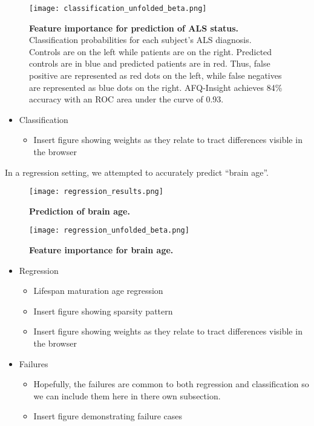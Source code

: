 \begin{figure}[!h]
    \centering
    \texttt{[image: classification\_unfolded\_beta.png]}
    \caption{{\bf Feature importance for prediction of ALS status.}
        Classification probabilities for each subject's ALS diagnosis. Controls are on the left while patients are on the right. Predicted controls are in blue and predicted patients are in red. Thus, false positive are represented as red dots on the left, while false negatives are represented as blue dots on the right. AFQ-Insight achieves 84\% accuracy with an ROC area under the curve of 0.93.
    }
    \label{fig:class-beta}
\end{figure}

\begin{itemize}
  \item Classification
    \begin{itemize}
      \item Insert figure showing weights as they relate to tract differences visible in the browser
    \end{itemize}
\end{itemize}

In a regression setting, we attempted to accurately predict ``brain age''.

\begin{figure}[!h]
    \centering
    \texttt{[image: regression\_results.png]}
    \caption{{\bf Prediction of brain age.}
    }
    \label{fig:regress-results}
\end{figure}

\begin{figure}[!h]
    \centering
    \texttt{[image: regression\_unfolded\_beta.png]}
    \caption{{\bf Feature importance for brain age.}
    }
    \label{fig:regress-beta}
\end{figure}

\begin{itemize}
  \item Regression
    \begin{itemize}
      \item Lifespan maturation age regression
      \item Insert figure showing sparsity pattern
      \item Insert figure showing weights as they relate to tract differences visible in the browser
    \end{itemize}
\end{itemize}
\begin{itemize}
  \item Failures
    \begin{itemize}
      \item Hopefully, the failures are common to both regression
        and classification so we can include them here in there own
        subsection.
      \item Insert figure demonstrating failure cases
    \end{itemize}
\end{itemize}
